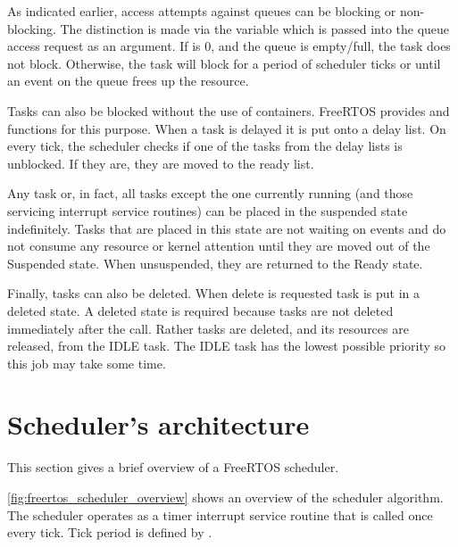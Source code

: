 As indicated earlier, access attempts against queues can be blocking or non-blocking.
The distinction is made via the  variable which is passed into the queue
access request as an argument. If  is 0, and the queue is empty/full, the
task does not block. Otherwise, the task will block for a period of 
scheduler ticks or until an event on the queue frees up the resource.

Tasks can also be blocked without the use of containers. FreeRTOS provides  and  functions for this purpose. When a task is delayed it is put onto a delay list. On every tick, the scheduler checks if one of the tasks from the delay lists is unblocked. If they are, they are moved to the ready list.

Any task or, in fact, all tasks except the one currently running (and those servicing interrupt service routines)
can be placed in the suspended state indefinitely. Tasks that are placed in this state are
not waiting on events and do not consume any resource or kernel attention until they are
moved out of the Suspended state. When unsuspended, they are returned to the Ready state.

Finally, tasks can also be deleted. When delete is requested task is put in a deleted state. A deleted state is required because tasks are not deleted immediately after the call. Rather tasks are deleted, and its resources are released, from the IDLE task. The IDLE task has the lowest possible priority so this job may take some time.

\section{Scheduler's architecture}

This section gives a brief overview of a FreeRTOS scheduler.

\autoref{fig:freertos_scheduler_overview} shows an overview of the scheduler algorithm. The scheduler operates as a timer interrupt service routine that is called once every tick. Tick period is defined by . 

